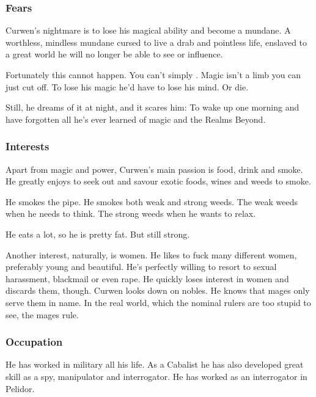 \subsubsection{Fears}
Curwen's nightmare is to lose his magical ability and become a mundane. 
A worthless, mindless mundane cursed to live a drab and pointless life, enslaved to a great world he will no longer be able to see or influence. 

Fortunately this cannot happen. 
You can't simply . 
Magic isn't a limb you can just cut off. 
To lose his magic he'd have to lose his mind. 
Or die. 

Still, he dreams of it at night, and it scares him: To wake up one morning and have forgotten all he's ever learned of magic and the Realms Beyond.  





\subsubsection{Interests}
Apart from magic and power, Curwen's main passion is food, drink and smoke. 
He greatly enjoys to seek out and savour exotic foods, wines and weeds to smoke. 

He smokes the pipe. 
He smokes both weak and strong weeds. 
The weak weeds when he needs to think. 
The strong weeds when he wants to relax. 

He eats a lot, so he is pretty fat. 
But still strong. 

Another interest, naturally, is women. 
He likes to fuck many different women, preferably young and beautiful. 
He's perfectly willing to resort to sexual harassment, blackmail or even rape. 
He quickly loses interest in women and discards them, though. 
Curwen looks down on nobles. 
He knows that mages only serve them in name. 
In the real world, which the nominal rulers are too stupid to see, the mages rule. 





\subsubsection{Occupation}
He has worked in military \ishroth{} all his life. 
As a Cabalist he has also developed great skill as a spy, manipulator and interrogator. 
He has worked as an interrogator in Pelidor. 





